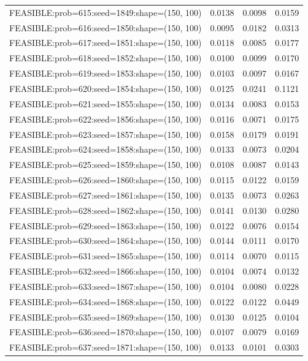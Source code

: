 \begin{longtable}{lccc}
FEASIBLE:prob=615:seed=1849:shape=(150, 100) &   0.0138 & 0.0098 & 0.0159 \\
FEASIBLE:prob=616:seed=1850:shape=(150, 100) &   0.0095 & 0.0182 & 0.0313 \\
FEASIBLE:prob=617:seed=1851:shape=(150, 100) &   0.0118 & 0.0085 & 0.0177 \\
FEASIBLE:prob=618:seed=1852:shape=(150, 100) &   0.0100 & 0.0099 & 0.0170 \\
FEASIBLE:prob=619:seed=1853:shape=(150, 100) &   0.0103 & 0.0097 & 0.0167 \\
FEASIBLE:prob=620:seed=1854:shape=(150, 100) &   0.0125 & 0.0241 & 0.1121 \\
FEASIBLE:prob=621:seed=1855:shape=(150, 100) &   0.0134 & 0.0083 & 0.0153 \\
FEASIBLE:prob=622:seed=1856:shape=(150, 100) &   0.0116 & 0.0071 & 0.0175 \\
FEASIBLE:prob=623:seed=1857:shape=(150, 100) &   0.0158 & 0.0179 & 0.0191 \\
FEASIBLE:prob=624:seed=1858:shape=(150, 100) &   0.0133 & 0.0073 & 0.0204 \\
FEASIBLE:prob=625:seed=1859:shape=(150, 100) &   0.0108 & 0.0087 & 0.0143 \\
FEASIBLE:prob=626:seed=1860:shape=(150, 100) &   0.0115 & 0.0122 & 0.0159 \\
FEASIBLE:prob=627:seed=1861:shape=(150, 100) &   0.0135 & 0.0073 & 0.0263 \\
FEASIBLE:prob=628:seed=1862:shape=(150, 100) &   0.0141 & 0.0130 & 0.0280 \\
FEASIBLE:prob=629:seed=1863:shape=(150, 100) &   0.0122 & 0.0076 & 0.0154 \\
FEASIBLE:prob=630:seed=1864:shape=(150, 100) &   0.0144 & 0.0111 & 0.0170 \\
FEASIBLE:prob=631:seed=1865:shape=(150, 100) &   0.0114 & 0.0070 & 0.0115 \\
FEASIBLE:prob=632:seed=1866:shape=(150, 100) &   0.0104 & 0.0074 & 0.0132 \\
FEASIBLE:prob=633:seed=1867:shape=(150, 100) &   0.0104 & 0.0080 & 0.0228 \\
FEASIBLE:prob=634:seed=1868:shape=(150, 100) &   0.0122 & 0.0122 & 0.0449 \\
FEASIBLE:prob=635:seed=1869:shape=(150, 100) &   0.0130 & 0.0125 & 0.0104 \\
FEASIBLE:prob=636:seed=1870:shape=(150, 100) &   0.0107 & 0.0079 & 0.0169 \\
FEASIBLE:prob=637:seed=1871:shape=(150, 100) &   0.0133 & 0.0101 & 0.0303 \\

\end{longtable}
